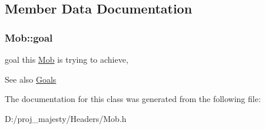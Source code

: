 \subsection{Member Data Documentation}
\subsubsection[{\texorpdfstring{goal}{goal}}]{ Mob\+::goal\hspace{0.3cm}{\ttfamily [protected]}}\hypertarget{class_mob_ad6c2e1b70a39551fd39b25002dac55b1}{}\label{class_mob_ad6c2e1b70a39551fd39b25002dac55b1}


goal this \hyperlink{class_mob}{Mob} is trying to achieve, 

\begin{DoxySeeAlso}{See also}
\hyperlink{class_mob_a886346a9f913203df0797f2c84dd8962}{Goals} 
\end{DoxySeeAlso}


The documentation for this class was generated from the following file\+:\begin{DoxyCompactItemize}
\item 
D\+:/proj\+\_\+majesty/\+Headers/Mob.\+h\end{DoxyCompactItemize}
